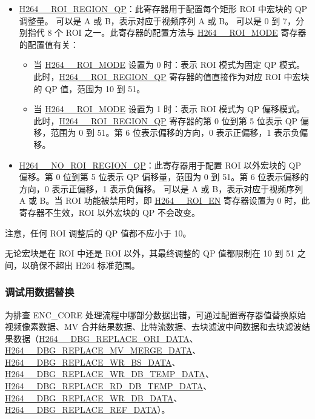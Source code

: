 \documentclass[main\_\_CN.tex]{subfiles}
\begin{document}
\begin{itemize}
\begin{itemize}
        \end{itemize}
    \item \hyperref[fielddesc:H264AROIREGION0QP]{H264\_\_ROI\_REGION\_QP}：此寄存器用于配置每个矩形 ROI 中宏块的 QP 调整量。 可以是 A 或 B，表示对应于视频序列 A 或 B。 可以是 0 到 7，分别指代 8 个 ROI 之一。此寄存器的配置方法与 \hyperref[fielddesc:H264AROIMODE]{H264\_\_ROI\_MODE} 寄存器的配置值有关：
        \begin{itemize}
            \item 当 \hyperref[fielddesc:H264AROIMODE]{H264\_\_ROI\_MODE} 设置为 0 时：表示 ROI 模式为固定 QP 模式。此时，\hyperref[fielddesc:H264AROIREGION0QP]{H264\_\_ROI\_REGION\_QP} 寄存器的值直接作为对应 ROI 中宏块的 QP 值，范围为 10 到 51。
            \item 当 \hyperref[fielddesc:H264AROIMODE]{H264\_\_ROI\_MODE} 设置为 1 时：表示 ROI 模式为 QP 偏移模式。此时，\hyperref[fielddesc:H264AROIREGION0QP]{H264\_\_ROI\_REGION\_QP} 寄存器的第 0 位到第 5 位表示 QP 偏移，范围为 0 到 51。第 6 位表示偏移的方向，0 表示正偏移，1 表示负偏移。
        \end{itemize}
    \item \hyperref[fielddesc:H264ANOROIREGIONQP]{H264\_\_NO\_ROI\_REGION\_QP}：此寄存器用于配置 ROI 以外宏块的 QP 偏移。第 0 位到第 5 位表示 QP 偏移量，范围为 0 到 51。第 6 位表示偏移的方向，0 表示正偏移，1 表示负偏移。 可以是 A 或 B，表示对应于视频序列 A 或 B。当 ROI 功能被禁用时，即 \hyperref[fielddesc:H264AROIEN]{H264\_\_ROI\_EN} 寄存器设置为 0 时，此寄存器不生效，ROI 以外宏块的 QP 不会改变。
\end{itemize}

注意，任何 ROI 调整后的 QP 值都不应小于 10。

无论宏块是在 ROI 中还是 ROI 以外，其最终调整的 QP 值都限制在 10 到 51 之间，以确保不超出 H264 标准范围。


\subsubsection{调试用数据替换}\label{sec:h264-debug-func}
为排查 ENC\_CORE 处理流程中哪部分数据出错，可通过配置寄存器值替换原始视频像素数据、MV 合并结果数据、比特流数据、去块滤波中间数据和去块滤波结果数据（\hyperref[fielddesc:H264DBGREPLACEORIDATA]{H264\_\_DBG\_REPLACE\_ORI\_DATA}、\hyperref[fielddesc:H264DBGREPLACEMVMERGEDATA]{H264\_\_DBG\_REPLACE\_MV\_MERGE\_DATA}、\hyperref[fielddesc:H264DBGREPLACEWRBSDATA]{H264\_\_DBG\_REPLACE\_WR\_BS\_DATA}、\hyperref[fielddesc:H264DBGREPLACEWRDBTEMPDATA]{H264\_\_DBG\_REPLACE\_WR\_DB\_TEMP\_DATA}、\hyperref[fielddesc:H264DBGREPLACERDDBTEMPDATA]{H264\_\_DBG\_REPLACE\_RD\_DB\_TEMP\_DATA}、\hyperref[fielddesc:H264DBGREPLACEWRDBDATA]{H264\_\_DBG\_REPLACE\_WR\_DB\_DATA}、\hyperref[fielddesc:H264DBGREPLACEREFDATA]{H264\_\_DBG\_REPLACE\_REF\_DATA}）。
\end{document}
